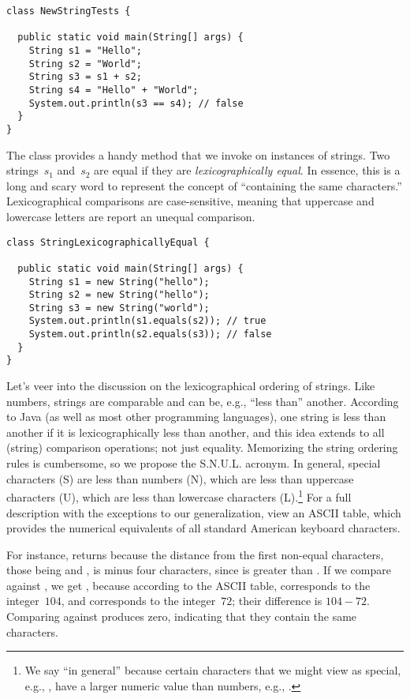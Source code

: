 \begin{lstlisting}[language=MyJava]
class NewStringTests {

  public static void main(String[] args) {
    String s1 = "Hello";
    String s2 = "World";
    String s3 = s1 + s2;
    String s4 = "Hello" + "World";
    System.out.println(s3 == s4); // false
  }
}
\end{lstlisting}

The  class provides a handy  method that we invoke on instances of strings. 
Two strings~$s_1$ and~$s_2$ are equal if they are \emph{lexicographically equal}. 
In essence, this is a long and scary word to represent the concept of ``containing the same characters.'' 
Lexicographical comparisons are case-sensitive, meaning that uppercase and lowercase letters are report an unequal comparison.

\begin{lstlisting}[language=MyJava]
class StringLexicographicallyEqual {

  public static void main(String[] args) {
    String s1 = new String("hello");
    String s2 = new String("hello");
    String s3 = new String("world");
    System.out.println(s1.equals(s2)); // true
    System.out.println(s2.equals(s3)); // false
  }
}
\end{lstlisting}

Let's veer into the discussion on the lexicographical ordering of strings. 
Like numbers, strings are comparable and can be, e.g., ``less than'' another. 
According to Java (as well as most other programming languages), one string is less than another if it is lexicographically less than another, and this idea extends to all (string) comparison operations; not just equality. 
Memorizing the string ordering rules is cumbersome, so we propose the S.N.U.L. acronym. 
In general, special characters (S) are less than numbers (N), which are less than uppercase characters (U), which are less than lowercase characters (L).\footnote{We say ``in general'' because certain characters that we might view as special, e.g., , have a larger numeric value than numbers, e.g., \ttt{\q{}2\q{}}.} 
For a full description with the exceptions to our generalization, view an ASCII table, which provides the numerical equivalents of all standard American keyboard characters. 

For instance,  returns  because the distance from the first non-equal characters, those being  and \ttt{\q{}\q}, is minus four characters, since  is greater than . 
If we compare  against , we get , because according to the ASCII table,  corresponds to the integer~$104$, and  corresponds to the integer~$72$; their difference is $104 - 72$. 
Comparing  against  produces zero, indicating that they contain the same characters.

